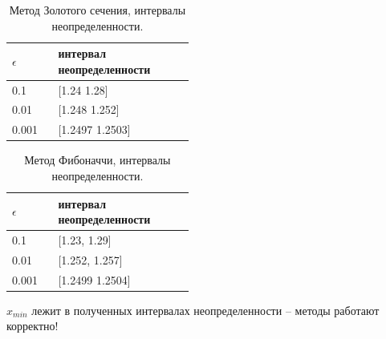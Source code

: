 \documentclass[main.tex]{subfiles}
\begin{document}
	\begin{table}[h]
		\begin{tabular} { | p{0.1\linewidth} | p{0.35\linewidth} |}
			\hline
			$\epsilon$ &  интервал неопределенности  \\ \hline
			0.1 & [1.24 1.28]   \\ \hline
			0.01 & [1.248 1.252] \\ \hline
			0.001 & [1.2497 1.2503]    \\ \hline
		\end{tabular}
		\caption{Метод Золотого сечения, интервалы неопределенности.}
	\end{table}
	
	
	\begin{table}[h]
		\begin{tabular} { | p{0.1\linewidth} | p{0.35\linewidth} |}
			\hline
			$\epsilon$ &  интервал неопределенности  \\ \hline
			0.1 & [1.23, 1.29]   \\ \hline
			0.01 & [1.252, 1.257] \\ \hline
			0.001 & [1.2499 1.2504]    \\ \hline
		\end{tabular}
		\caption{Метод Фибоначчи, интервалы неопределенности.}
	\end{table}
	$x_{min}$ лежит в полученных интервалах неопределенности -- методы работают корректно!
	
	
\end{document}
